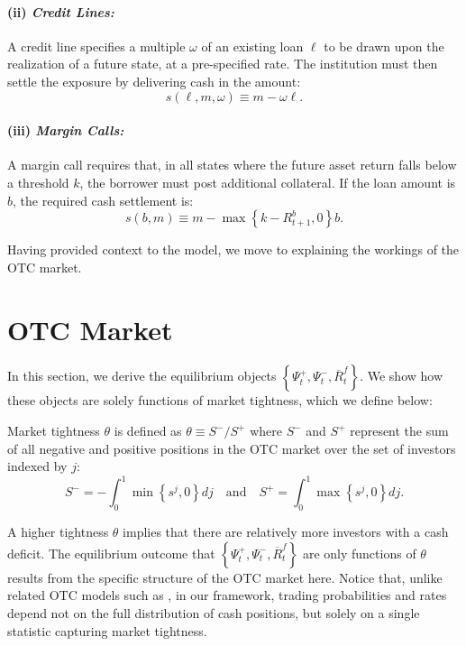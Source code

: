 \documentclass[12pt,american,english,notitlepage]{article}
\begin{document}
\paragraph*{(ii) \textit{Credit Lines:}} 

A credit line specifies a multiple $\omega$ of an existing loan $\ell$ to be drawn upon the realization of a future state, at a pre-specified rate. The institution must then settle the exposure by delivering cash in the amount:
\[
s(\ell, m, \omega) \equiv m - \omega \ell.
\]

\paragraph*{(iii) \textit{Margin Calls:}} 

A margin call requires that, in all states where the future asset return falls below a threshold $k$, the borrower must post additional collateral. If the loan amount is $b$, the required cash settlement is:
\[
s(b, m) \equiv m - \max\left\{k - R_{t+1}^{b}, 0\right\} b.
\]

Having provided context to the model, we move to explaining the workings of the OTC market. 
\section{OTC Market}

\label{sec:OTC}

In this section, we derive the equilibrium objects
$\left\{ \Psi_{t}^{+},\Psi_{t}^{-},\overline{R}_{t}^{f}\right\} $. We show how these objects are solely functions of 
 market tightness, which we define below:

\begin{definition} Market tightness $\theta$ is defined as $\theta\equiv S^{-}/S^{+}$
where $S^{-}$ and $S^{+}$ represent the sum of all negative and
positive positions in the OTC market over the set of investors indexed
by $j$: 
\[
S^{-}=-\int_{0}^{1}\min\left\{ s^{j},0\right\} dj\quad\text{and}\quad S^{+}=\int_{0}^{1}\max\left\{ s^{j},0\right\} dj.
\]
\end{definition}

A higher tightness $\theta$ implies that there are relatively more
investors with a cash deficit. The equilibrium outcome that $\left\{ \Psi_{t}^{+},\Psi_{t}^{-},\overline{R}_{t}^{f}\right\} $
are only functions of $\theta$ results from the specific structure of the OTC
market here. Notice that, unlike related OTC models such as \cite{AL15-ECMA,LagosNavarro2023}, in our framework, trading probabilities and rates depend not on the full distribution of cash positions, but solely on a single statistic capturing market tightness.
\end{document}
